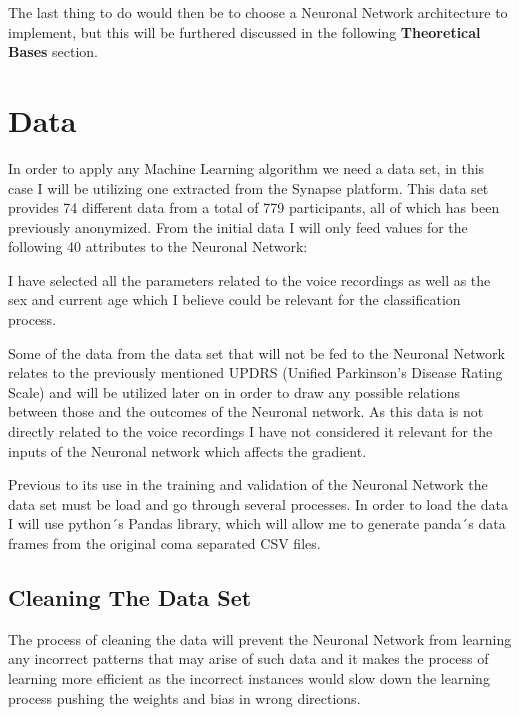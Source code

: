 \documentclass[12pt, a4paper]{article}
\begin{document}
	The last thing to do would then be to choose a Neuronal Network architecture to implement, but this will be furthered discussed in the following \textbf{Theoretical Bases} section.
	
	\clearpage
	
	\section{Data}
	
	In order to apply any Machine Learning algorithm we need a data set, in this case I will be utilizing one extracted from the Synapse platform. This data set provides 74 different data from a total of 779 participants, all of which has been previously anonymized. From the initial data I will only feed values for the following 40 attributes to the Neuronal Network:
	
	
	I have selected all the parameters related to the voice recordings as well as the sex and current age which I believe could be relevant for the classification process.
	 
	Some of the data from the data set that will not be fed to the Neuronal Network relates to the previously mentioned UPDRS (Unified Parkinson's Disease Rating Scale) and will be utilized later on in order to draw any possible relations between those and the outcomes of the Neuronal network. As this data is not directly related to the voice recordings I have not considered it relevant for the inputs of the Neuronal network which affects the gradient.
	
	Previous to its use in the training and validation of the Neuronal Network the data set must be load and go through several processes. In order to load the data I will use python´s Pandas library, which will allow me to generate panda´s data frames from the original coma separated CSV files.
	
	\clearpage
	
	\subsection{Cleaning The Data Set }
	
	The process of cleaning the data will prevent the Neuronal Network from learning any incorrect patterns that may arise of such data and it makes the process of learning more efficient as the incorrect instances would slow down the learning process pushing the weights and bias in wrong directions.
	
\end{document}
